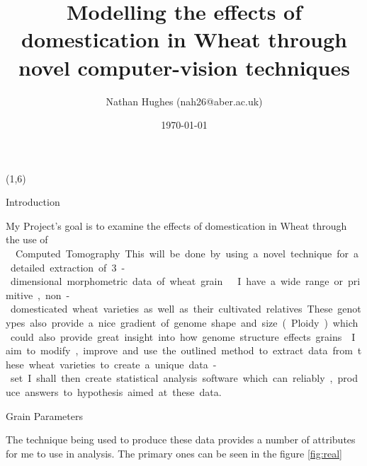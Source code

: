 \documentclass[final]{beamer}
\title{Modelling the effects of domestication in Wheat through novel computer-vision techniques}
\author{Nathan Hughes (nah26@aber.ac.uk)}
\date{\today}
\begin{document}
\begin{frame}{} 

  \begin{textblock}{27.7}(1,6)

    \begin{block}{Introduction}


      My Project's goal is to examine the effects of domestication in Wheat through the use of \si\micro\-Computed Tomography.
      This will be done by using a novel technique for a detailed extraction of 3-dimensional morphometric data of wheat grain \cite{Hughes2017}.

      \vspace{0.5cm}
      
      I have a wide range or primitive, non-domesticated wheat varieties
      as well as their cultivated relatives. These genotypes also provide a nice gradient of genome shape and size (Ploidy)
      which could also provide great insight into how genome structure effects grains.

      \vspace{0.5cm}
      
      I aim to modify, improve and use the outlined method to extract data from these wheat varieties to create a unique data-set.
      I shall then create statistical analysis software which can reliably, produce answers to hypothesis aimed at these data.
      
    \end{block}


    \begin{block}{Grain Parameters}

      The technique being used to produce these data provides a number of attributes for me to use in
      analysis. The primary ones can be seen in the figure \ref{fig:real}

      \begin{multicols}{2}


\end{multicols}
\end{block}
\end{textblock}
\end{frame}
\end{document}
